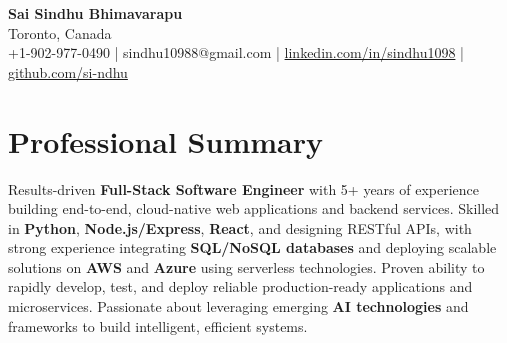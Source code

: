 \documentclass[letterpaper,11pt]{article}
\begin{document}
\begin{center}
  {\Large \textbf{Sai Sindhu Bhimavarapu}} \\
  Toronto, Canada \\
  +1-902-977-0490 \enspace | \enspace sindhu10988@gmail.com \enspace | \enspace \href{https://www.linkedin.com/in/sindhu1098/}{linkedin.com/in/sindhu1098} \enspace | \enspace \href{https://github.com/si-ndhu}{github.com/si-ndhu}
\end{center}

\section{Professional Summary}
  \begin{itemize}[leftmargin=0.15in, label={}]
    \small{\item{
     Results-driven \textbf{Full-Stack Software Engineer} with 5+ years of experience building end-to-end, cloud-native web applications and backend services. Skilled in \textbf{Python}, \textbf{Node.js/Express}, \textbf{React}, and designing RESTful APIs, with strong experience integrating \textbf{SQL/NoSQL databases} and deploying scalable solutions on \textbf{AWS} and \textbf{Azure} using serverless technologies. Proven ability to rapidly develop, test, and deploy reliable production-ready applications and microservices. Passionate about leveraging emerging \textbf{AI technologies} and frameworks to build intelligent, efficient systems.
    }}
  \end{itemize}
\vspace{-16pt}

\end{document}

